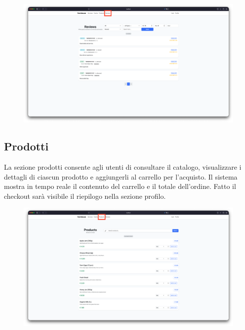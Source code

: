 \documentclass[a4paper,12pt]{report}
\begin{document}
\begin{figure}[H]
    \centering
    \includegraphics[width=\textwidth, trim=0 0 0 0]{./img/users/reviews.png}
    \vspace{-1em}
    \label{fig:reviews}
\end{figure}

\subsection*{Prodotti}

La sezione prodotti consente agli utenti di consultare il catalogo, visualizzare i dettagli di 
ciascun prodotto e aggiungerli al carrello per l'acquisto. Il sistema mostra in tempo reale il 
contenuto del carrello e il totale dell'ordine. Fatto il checkout sarà visibile il riepilogo 
nella sezione profilo.

\begin{figure}[H]
    \centering
    \includegraphics[width=\textwidth, trim=0 0 0 0]{./img/users/products.png}
    \vspace{-1em}
    \label{fig:products}
\end{figure}
\end{document}
